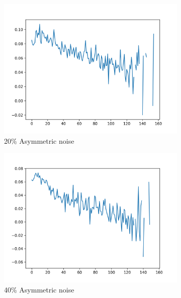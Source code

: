 \documentclass{article}
\begin{document}
\begin{figure}[h]
\begin{subfigure}[b]{0.22\textwidth}
        \includegraphics[width=\textwidth]{figs/Dense100_asym_new_plot_20.png}
        \vspace{-.5cm}
        \caption{20\% Asymmetric noise}
    \end{subfigure}
    \begin{subfigure}[b]{0.22\textwidth}
        \includegraphics[width=\textwidth]{figs/Dense100_asym_new_40_plot.png}
        \vspace{-.5cm}
        \caption{40\% Asymmetric noise}
    \end{subfigure}
        \begin{subfigure}[b]{0.22\textwidth}

\end{subfigure}
\end{figure}
\end{document}
